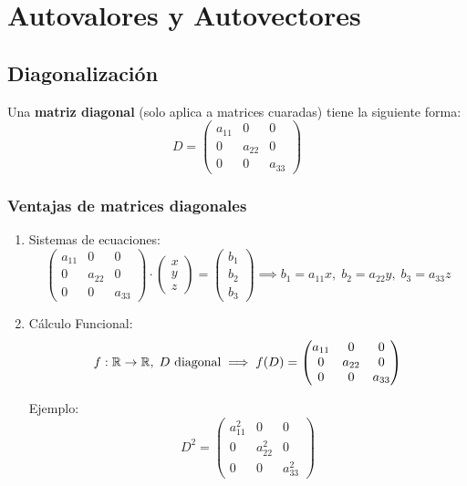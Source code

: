 \section*{Autovalores y Autovectores}
\subsection{Diagonalización}    
Una \textbf{matriz diagonal} (solo aplica a matrices cuaradas) tiene la siguiente forma:
\[
    D = \begin{pmatrix} a_{11} & 0 & 0\\
                        0 & a_{22} & 0\\
                        0 & 0 & a_{33}\end{pmatrix}
\]
\subsubsection{Ventajas de matrices diagonales}
\begin{enumerate}
    \item Sistemas de ecuaciones:
        \[
     \begin{pmatrix} a_{11} & 0 & 0\\
                        0 & a_{22} & 0\\
                        0 & 0 & a_{33}\end{pmatrix} \cdot \begin{pmatrix}  x \\ y \\ z \end{pmatrix} = 
                        \begin{pmatrix}  b_1 \\ b_2 \\ b_3 \end{pmatrix} \implies b_1 = a_{11}x, \; b_2 = a_{22}y, \; b_3 = a_{33}z
        \]
    \item Cálculo Funcional:
        \[
            f: \mathbb{R} \to \mathbb{R}, \; D \text{ diagonal} \implies f(D) = \begin{pmatrix} a_{11} & 0 & 0\\
                        0 & a_{22} & 0\\
                        0 & 0 & a_{33}\end{pmatrix}
        \]

        Ejemplo:
        \[
            D^2  =     \begin{pmatrix} a_{11}^2 & 0 & 0\\
                        0 & a_{22}^2 & 0\\
                        0 & 0 & a_{33}^2\end{pmatrix}
        \]

\end{enumerate}

